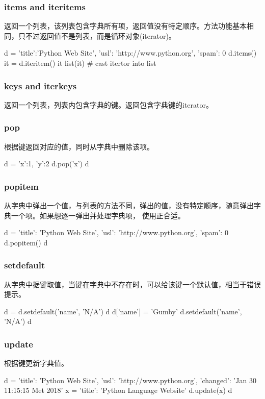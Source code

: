 \subsubsection{items and iteritems}
返回一个列表，该列表包含字典所有项，返回值没有特定顺序。方法功能基本相同，只不过返回值不是列表，而是循环对象(iterator)。
\begin{python}
  d = { 'title':'Python Web Site', 'usl': 'http://www.python.org', 'spam': 0 }
  d.items()
  it = d.iteritem()
  it
  list(it)  # cast itertor into list
\end{python}
\subsubsection{keys and iterkeys}
返回一个列表，列表内包含字典的键。返回包含字典键的iterator。
\subsubsection{pop}
根据键返回对应的值，同时从字典中删除该项。
\begin{python}
d = {'x':1, 'y':2}
d.pop('x')
d
\end{python}
\subsubsection{popitem}
从字典中弹出一个值，与列表的方法不同，弹出的值，没有特定顺序，随意弹出字典一个项。如果想逐一弹出并处理字典项， 使用正合适。
\begin{python}
d = {
    'title': 'Python Web Site',
    'usl': 'http://www.python.org',
    'spam': 0
}
d.popitem()
d
\end{python}
\subsubsection{setdefault}
从字典中据键取值，当键在字典中不存在时，可以给该键一个默认值，相当于错误提示。
\begin{python}
d = {}
d.setdefault('name', 'N/A')
d
d['name'] = 'Gumby'
d.setdefault('name', 'N/A')
d
\end{python}
\subsubsection{update}
根据键更新字典值。
\begin{python}
d = {
    'title': 'Python Web Site',
    'usl': 'http://www.python.org',
    'changed': 'Jan 30 11:15:15 Met 2018'
  }
  x = {'title': 'Python Language Website'}
  d.update(x)
  d
\end{python}
